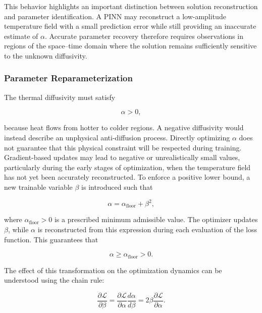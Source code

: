 This behavior highlights an important distinction between solution
reconstruction and parameter identification. A PINN may reconstruct a
low-amplitude temperature field with a small prediction error while still
providing an inaccurate estimate of $\alpha$. Accurate parameter recovery
therefore requires observations in regions of the space--time domain where the
solution remains sufficiently sensitive to the unknown diffusivity.

\subsubsection{Parameter Reparameterization}

The thermal diffusivity must satisfy

\begin{equation}
\alpha > 0,
\end{equation}

because heat flows from hotter to colder regions. A negative diffusivity would
instead describe an unphysical anti-diffusion process. Directly optimizing $\alpha$ does not guarantee that this physical constraint
will be respected during training. Gradient-based updates may lead to negative
or unrealistically small values, particularly during the early stages of
optimization, when the temperature field has not yet been accurately
reconstructed. To enforce a positive lower bound, a new trainable variable $\beta$ is
introduced such that

\begin{equation}
\alpha
=
\alpha_{\mathrm{floor}}
+
\beta^2,
\end{equation}

where $\alpha_{\mathrm{floor}}>0$ is a prescribed minimum admissible value.
The optimizer updates $\beta$, while $\alpha$ is reconstructed from this
expression during each evaluation of the loss function. This guarantees that

\begin{equation}
\alpha
\geq
\alpha_{\mathrm{floor}}
>
0.
\end{equation}

The effect of this transformation on the optimization dynamics can be understood
using the chain rule:

\begin{equation}
\frac{\partial \mathcal{L}}{\partial \beta}
=
\frac{\partial \mathcal{L}}{\partial \alpha}
\frac{d\alpha}{d\beta}
=
2\beta
\frac{\partial \mathcal{L}}{\partial \alpha}.
\end{equation}

